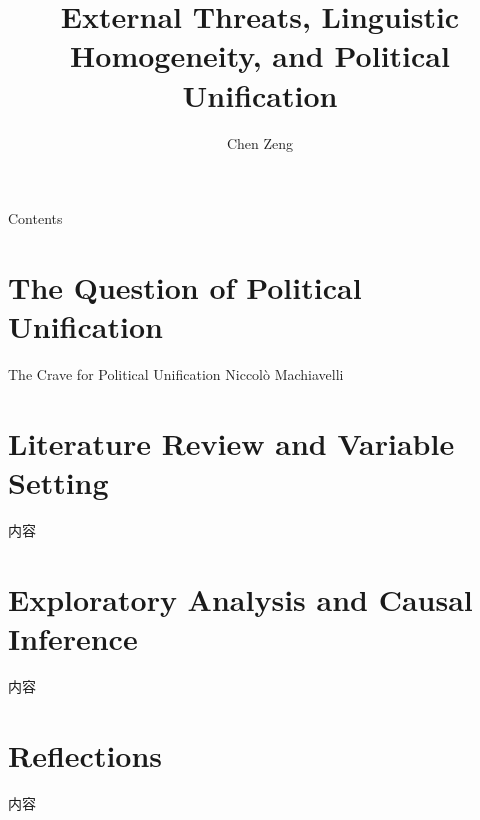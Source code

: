 \documentclass{beamer}
\title[Necessary Conditions of Political Unification]{External Threats, Linguistic Homogeneity, and Political Unification}
\author{Chen Zeng}
\institute[]{Department of Political Science \\ Renmin University of China}
\begin{document}
	\maketitle
	\begin{frame}{Contents}
		\tableofcontents
	\end{frame}
	\section{The Question of Political Unification}
	\begin{frame}{The Crave for Political Unification}
		Niccolò Machiavelli
	\end{frame}
	\section{Literature Review and Variable Setting}
	\begin{frame}{}
		内容
	\end{frame}
	\section{Exploratory Analysis and Causal Inference}
	\begin{frame}{}
		内容
	\end{frame}
	\section{Reflections}
	\begin{frame}{}
		内容
	\end{frame}
\end{document}
